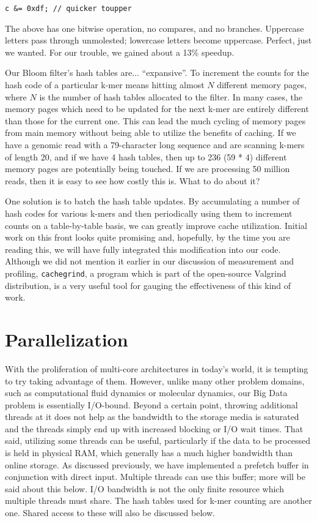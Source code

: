 \begin{verbatim}
c &= 0xdf; // quicker toupper
\end{verbatim}

The above has one bitwise operation, no compares, and no branches. Uppercase
letters pass through unmolested; lowercase letters become uppercase. Perfect,
just we wanted. For our trouble, we gained about a 13\% speedup.

Our Bloom filter's hash tables are... ``expansive''. To increment the counts
for the hash code of a particular k-mer means hitting almost $N$ different
memory pages, where $N$ is the number of hash tables allocated to the filter.
In many cases, the memory pages which need to be updated for the next k-mer are
entirely different than those for the current one. This can lead the much
cycling of memory pages from main memory without being able to utilize the
benefits of caching. If we have a genomic read with a 79-character long
sequence and are scanning k-mers of length 20, and if we have 4 hash tables,
then up to 236 (59 * 4) different memory pages are potentially being touched.
If we are processing 50 million reads, then it is easy to see how costly this
is. What to do about it?

One solution is to batch the hash table updates. By accumulating a number of
hash codes for various k-mers and then periodically using them to increment
counts on a table-by-table basis, we can greatly improve cache utilization.
Initial work on this front looks quite promising and, hopefully, by the time
you are reading this, we will have fully integrated this modification into our
code. Although we did not mention it earlier in our discussion of measurement
and profiling, \texttt{cachegrind}, a program which is part of the open-source
Valgrind \citep{web:Valgrind} distribution, is a very useful tool for gauging
the effectiveness of this kind of work.

\section{Parallelization}

With the proliferation of multi-core architectures in today's world, it is
tempting to try taking advantage of them. However, unlike many other problem
domains, such as computational fluid dynamics or molecular dynamics, our Big
Data problem is essentially I/O-bound. Beyond a certain point, throwing
additional threads at it does not help as the bandwidth to the storage media is
saturated and the threads simply end up with increased blocking or I/O wait
times. That said, utilizing some threads can be useful, particularly if the
data to be processed is held in physical RAM, which generally has a much higher
bandwidth than online storage. As discussed previously, we have implemented a
prefetch buffer in conjunction with direct input. Multiple threads can use this
buffer; more will be said about this below. I/O bandwidth is not the only
finite resource which multiple threads must share. The hash tables used for
k-mer counting are another one. Shared access to these will also be discussed
below.


